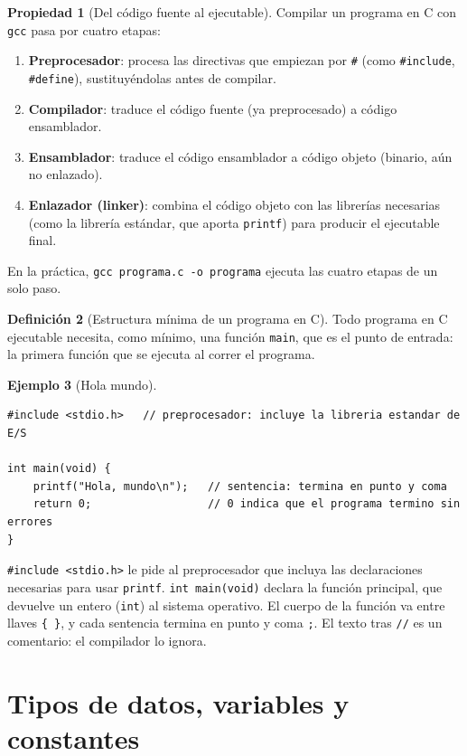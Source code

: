 \documentclass[11pt,letterpaper]{article}
\theoremstyle{definition}
\newtheorem{definicion}{Definición}[section]
\newtheorem{ejemplo}[definicion]{Ejemplo}
\newtheorem{propiedad}[definicion]{Propiedad}
\begin{document}
\begin{propiedad}[Del código fuente al ejecutable]
Compilar un programa en C con \texttt{gcc} pasa por cuatro etapas:
\begin{enumerate}[label=(\alph*)]
  \item \textbf{Preprocesador}: procesa las directivas que empiezan por \texttt{\#} (como
        \texttt{\#include}, \texttt{\#define}), sustituyéndolas antes de compilar.
  \item \textbf{Compilador}: traduce el código fuente (ya preprocesado) a código ensamblador.
  \item \textbf{Ensamblador}: traduce el código ensamblador a código objeto (binario, aún no
        enlazado).
  \item \textbf{Enlazador (linker)}: combina el código objeto con las librerías necesarias (como la
        librería estándar, que aporta \texttt{printf}) para producir el ejecutable final.
\end{enumerate}
En la práctica, \texttt{gcc programa.c -o programa} ejecuta las cuatro etapas de un solo paso.
\end{propiedad}

\begin{definicion}[Estructura mínima de un programa en C]
Todo programa en C ejecutable necesita, como mínimo, una función \texttt{main}, que es el punto de
entrada: la primera función que se ejecuta al correr el programa.
\end{definicion}

\begin{ejemplo}[Hola mundo]
\begin{lstlisting}[caption={Primer programa en C}]
#include <stdio.h>   // preprocesador: incluye la libreria estandar de E/S

int main(void) {
    printf("Hola, mundo\n");   // sentencia: termina en punto y coma
    return 0;                  // 0 indica que el programa termino sin errores
}
\end{lstlisting}
\texttt{\#include <stdio.h>} le pide al preprocesador que incluya las declaraciones necesarias para
usar \texttt{printf}. \texttt{int main(void)} declara la función principal, que devuelve un entero
(\texttt{int}) al sistema operativo. El cuerpo de la función va entre llaves \texttt{\{ \}}, y cada
sentencia termina en punto y coma \texttt{;}. El texto tras \texttt{//} es un comentario: el
compilador lo ignora.
\end{ejemplo}

\section{Tipos de datos, variables y constantes}
\end{document}
